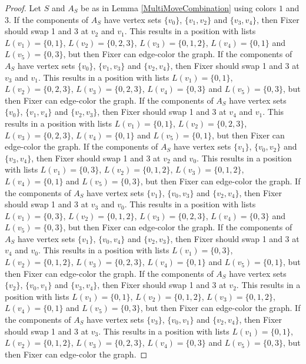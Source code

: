 \documentclass[12pt]{amsart}
\theoremstyle{plain}
\theoremstyle{definition}
\theoremstyle{remark}
\begin{document}
\begin{proof}
Let $S$ and $A_S$ be as in Lemma \ref{MultiMoveCombination} using colors $1$ and $3$. If the components of $A_S$ have vertex sets $\{v_0\}$, $\{v_1, v_2\}$ and $\{v_3, v_4\}$, then Fixer should swap 1 and 3 at $v_2$ and $v_1$. This results in a position with lists $L(v_1) = \{0, 1\}$, $L(v_2) = \{0, 2, 3\}$, $L(v_3) = \{0, 1, 2\}$, $L(v_4) = \{0, 1\}$ and $L(v_5) = \{0, 3\}$, but then Fixer can edge-color the graph.
If the components of $A_S$ have vertex sets $\{v_0\}$, $\{v_1, v_3\}$ and $\{v_2, v_4\}$, then Fixer should swap 1 and 3 at $v_3$ and $v_1$. This results in a position with lists $L(v_1) = \{0, 1\}$, $L(v_2) = \{0, 2, 3\}$, $L(v_3) = \{0, 2, 3\}$, $L(v_4) = \{0, 3\}$ and $L(v_5) = \{0, 3\}$, but then Fixer can edge-color the graph.
If the components of $A_S$ have vertex sets $\{v_0\}$, $\{v_1, v_4\}$ and $\{v_2, v_3\}$, then Fixer should swap 1 and 3 at $v_4$ and $v_1$. This results in a position with lists $L(v_1) = \{0, 1\}$, $L(v_2) = \{0, 2, 3\}$, $L(v_3) = \{0, 2, 3\}$, $L(v_4) = \{0, 1\}$ and $L(v_5) = \{0, 1\}$, but then Fixer can edge-color the graph.
If the components of $A_S$ have vertex sets $\{v_1\}$, $\{v_0, v_2\}$ and $\{v_3, v_4\}$, then Fixer should swap 1 and 3 at $v_2$ and $v_0$. This results in a position with lists $L(v_1) = \{0, 3\}$, $L(v_2) = \{0, 1, 2\}$, $L(v_3) = \{0, 1, 2\}$, $L(v_4) = \{0, 1\}$ and $L(v_5) = \{0, 3\}$, but then Fixer can edge-color the graph.
If the components of $A_S$ have vertex sets $\{v_1\}$, $\{v_0, v_3\}$ and $\{v_2, v_4\}$, then Fixer should swap 1 and 3 at $v_3$ and $v_0$. This results in a position with lists $L(v_1) = \{0, 3\}$, $L(v_2) = \{0, 1, 2\}$, $L(v_3) = \{0, 2, 3\}$, $L(v_4) = \{0, 3\}$ and $L(v_5) = \{0, 3\}$, but then Fixer can edge-color the graph.
If the components of $A_S$ have vertex sets $\{v_1\}$, $\{v_0, v_4\}$ and $\{v_2, v_3\}$, then Fixer should swap 1 and 3 at $v_4$ and $v_0$. This results in a position with lists $L(v_1) = \{0, 3\}$, $L(v_2) = \{0, 1, 2\}$, $L(v_3) = \{0, 2, 3\}$, $L(v_4) = \{0, 1\}$ and $L(v_5) = \{0, 1\}$, but then Fixer can edge-color the graph.
If the components of $A_S$ have vertex sets $\{v_2\}$, $\{v_0, v_1\}$ and $\{v_3, v_4\}$, then Fixer should swap 1 and 3 at $v_2$. This results in a position with lists $L(v_1) = \{0, 1\}$, $L(v_2) = \{0, 1, 2\}$, $L(v_3) = \{0, 1, 2\}$, $L(v_4) = \{0, 1\}$ and $L(v_5) = \{0, 3\}$, but then Fixer can edge-color the graph.
If the components of $A_S$ have vertex sets $\{v_3\}$, $\{v_0, v_1\}$ and $\{v_2, v_4\}$, then Fixer should swap 1 and 3 at $v_3$. This results in a position with lists $L(v_1) = \{0, 1\}$, $L(v_2) = \{0, 1, 2\}$, $L(v_3) = \{0, 2, 3\}$, $L(v_4) = \{0, 3\}$ and $L(v_5) = \{0, 3\}$, but then Fixer can edge-color the graph.

\end{proof}
\end{document}
